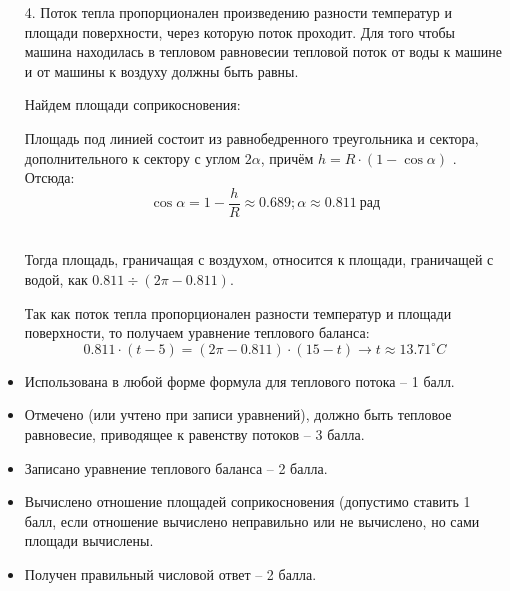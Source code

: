 \begin{enumerate}
    \item[4.] Поток тепла пропорционален произведению разности температур и площади поверхности, 
    через которую поток проходит. Для того чтобы машина находилась в тепловом равновесии тепловой поток 
    от воды к машине и от машины к воздуху должны быть равны.
    
    Найдем площади соприкосновения: 
    
    Площадь под линией состоит из равнобедренного треугольника и сектора, дополнительного к сектору с 
    углом $2 \alpha $, причём $h=R \cdot (1-\cos\alpha  )$ . Отсюда:
    $$\cos\alpha =1-\frac{h}{R} \approx 0.689;   \alpha  \approx 0.811 \: \text{рад}$$\

    Тогда площадь, граничащая с воздухом, относится к площади, граничащей с водой, как $0.811 \div (2 \pi-0.811)$. 
    
    Так как поток тепла пропорционален разности температур и площади поверхности, то получаем уравнение теплового баланса:
    $$0.811 \cdot (t-5)=(2 \pi-0.811) \cdot (15-t) \rightarrow t \approx 13.71^\circ C$$
\end{enumerate}

\additionalCriteria
    \begin{itemize}
        \item Использована в любой форме формула для теплового потока – 1 балл.
        \item Отмечено (или учтено при записи уравнений), должно быть тепловое равновесие, приводящее к равенству потоков – 3 балла.
        \item Записано уравнение теплового баланса – 2 балла.
        \item Вычислено отношение площадей соприкосновения (допустимо ставить 1 балл, если отношение вычислено неправильно или не вычислено, но сами площади вычислены.
        \item Получен правильный числовой ответ – 2 балла.
    \end{itemize}

